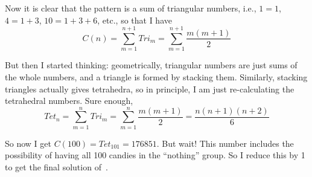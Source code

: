 \documentclass{article}
\begin{document}
\vspace{0.2in}

Now it is clear that the pattern is a sum of triangular numbers, i.e., $1=1$, $4=1+3$, $10=1+3+6$, etc., so that I have
\[
C(n)=\sum\limits_{m=1}^{n+1}Tri_{m}=\sum\limits_{m=1}^{n+1}\frac{m(m+1)}{2}
\]

But then I started thinking: geometrically, triangular numbers are just sums of the whole numbers, and a triangle is formed by stacking them.
Similarly, stacking triangles actually gives tetrahedra, so in principle, I am just re-calculating the tetrahedral numbers.
Sure enough,
\[
Tet_{n}=\sum\limits_{m=1}^{n}Tri_{m}=\sum\limits_{m=1}^{n}\frac{m(m+1)}{2}=\frac{n(n+1)(n+2)}{6}
\]

So now I get $C(100)=Tet_{101}=176851$.
But wait!
This number includes the possibility of having all 100 candies in the ``nothing'' group.
So I reduce this by 1 to get the final solution of
\,.
\end{document}
